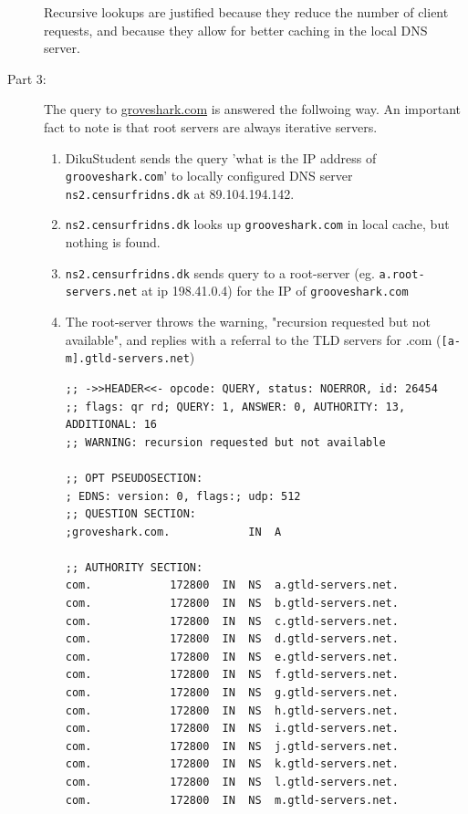 \begin{description}
        Recursive lookups are justified because they reduce the number of client requests,
        and because they allow for better caching in the local DNS server.
    \item[Part 3:] The query to \url{groveshark.com} is answered the follwoing
        way. An important fact to note is that root servers are always
        iterative servers.
        \begin{enumerate}
            \item DikuStudent sends the query 'what is the IP address of
                \texttt{grooveshark.com}' to locally configured DNS server
                \texttt{ns2.censurfridns.dk} at 89.104.194.142.
            \item \texttt{ns2.censurfridns.dk} looks up
                \texttt{grooveshark.com} in local cache, but nothing is found.
            \item \texttt{ns2.censurfridns.dk} sends query to a root-server
                (eg. \texttt{a.root-servers.net} at ip 198.41.0.4) for the
                IP of \texttt{grooveshark.com}
            \item The root-server throws the warning, "recursion requested but
                not available", and replies with a referral to the TLD servers
                for .com (\texttt{[a-m].gtld-servers.net})
                \begin{lstlisting}
;; ->>HEADER<<- opcode: QUERY, status: NOERROR, id: 26454
;; flags: qr rd; QUERY: 1, ANSWER: 0, AUTHORITY: 13, ADDITIONAL: 16
;; WARNING: recursion requested but not available

;; OPT PSEUDOSECTION:
; EDNS: version: 0, flags:; udp: 512
;; QUESTION SECTION:
;groveshark.com.            IN  A

;; AUTHORITY SECTION:
com.            172800  IN  NS  a.gtld-servers.net.
com.            172800  IN  NS  b.gtld-servers.net.
com.            172800  IN  NS  c.gtld-servers.net.
com.            172800  IN  NS  d.gtld-servers.net.
com.            172800  IN  NS  e.gtld-servers.net.
com.            172800  IN  NS  f.gtld-servers.net.
com.            172800  IN  NS  g.gtld-servers.net.
com.            172800  IN  NS  h.gtld-servers.net.
com.            172800  IN  NS  i.gtld-servers.net.
com.            172800  IN  NS  j.gtld-servers.net.
com.            172800  IN  NS  k.gtld-servers.net.
com.            172800  IN  NS  l.gtld-servers.net.
com.            172800  IN  NS  m.gtld-servers.net.


\end{lstlisting}
\end{enumerate}
\end{description}
